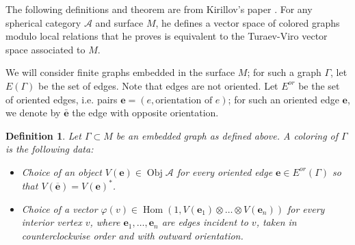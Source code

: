 \documentclass{amsart}
\newtheorem{defn}[thm]{Definition}
\DeclareMathOperator{\Hom}{Hom}
\DeclareMathOperator{\Obj}{Obj}
\begin{document}
\newcommand{\ee}{\mathbf{e}}       %
\newcommand{\Ga}{\Gamma}
\newcommand{\ph}{\varphi}
\newcommand{\A}{\mathcal{A}}      %
\newcommand{\st}{\; | \;}                               %
\newcommand{\ttt}{\otimes}                              %
\newcommand{\cc}[1]{\underset{\scriptstyle #1}{\circ}}
\newcommand{\ccc}[1]{\underset{\scriptstyle #1}{\bullet}}
\newcommand{\ti}{\tilde}
\newcommand{\ov}{\overline}
\newcommand{\del}{\partial}
\newcommand{\<}{\langle}
\renewcommand{\>}{\rangle}
\newcommand{\surjto}{\twoheadrightarrow}      %
\newcommand{\injto}{\hookrightarrow}          %
\newcommand{\isoto}{\xrightarrow{\sim}}       %
\newcommand{\xxto}{\xrightarrow}              %
\newcommand{\firef}[1]{Figure~{\rm\ref{#1}}}
\newcommand{\R}{\mathbb{R}}       %

The following definitions and theorem are from Kirillov's paper
 \cite{kirillovStringNets}.  For any spherical category $\mathcal A$
and surface $M$, he defines a vector space of colored graphs modulo
local relations that he proves is equivalent to the Turaev-Viro 
vector space associated to $M$.

We will consider finite  graphs embedded in the surface $M$; for such a
graph $\Ga$, let $E(\Ga)$ be the set of edges. Note that edges are not
oriented. Let $E^{or}$ be the set of oriented edges, i.e. pairs $\ee=(e,
\text{orientation of } e)$; for such an oriented edge $\ee$, we denote by
$\bar{\ee}$ the edge with opposite orientation.

\begin{defn}\label{d:coloring} Let  $\Ga \subset M$ be an embedded graph as
defined above.  A {\em coloring} of $\Ga$ is the
following data:

  \begin{itemize}
    \item Choice of an object $V(\ee)\in \Obj \A$ for every oriented edge
        $\ee\in E^{or}(\Ga)$ so that $V(\ov{\ee})=V(\ee)^*$.
    \item Choice of a vector $\ph(v)\in \Hom (1, V(\ee_1) \otimes \dots \otimes V(\ee_n))$  for    every interior vertex $v$, where 
      $\ee_1, \dots, \ee_n$ are edges incident to $v$, taken in counterclockwise 
      order and with outward orientation. 
\end{itemize}
\end{defn}
\end{document}
